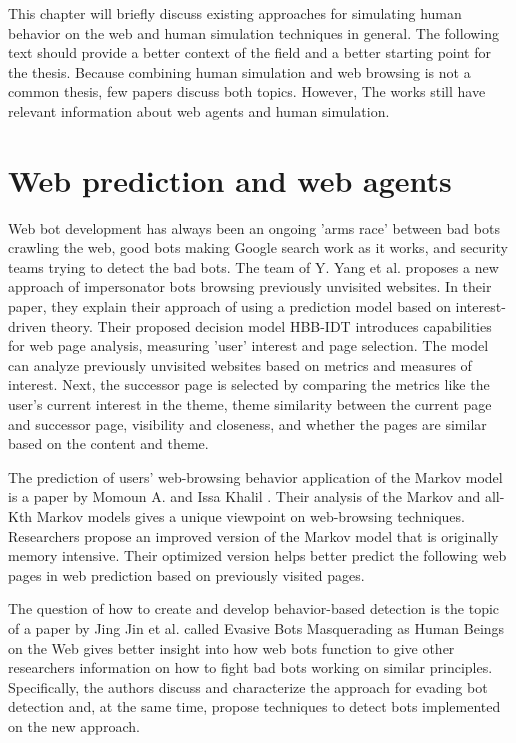 This chapter will briefly discuss existing approaches for simulating human behavior on the web and human simulation techniques in general. The following text should provide a better context of the field and a better starting point for the thesis. Because combining human simulation and web browsing is not a common thesis, few papers discuss both topics. However, The works still have relevant information about web agents and human simulation.

\section{Web prediction and web agents}

Web bot development has always been an ongoing 'arms race' between bad bots crawling the web, good bots making Google search work as it works, and security teams trying to detect the bad bots. The team of Y. Yang et al. \cite{inproceedings} proposes a new approach of impersonator bots browsing previously unvisited websites. In their paper, they explain their approach of using a prediction model based on interest-driven theory. Their proposed decision model HBB-IDT introduces capabilities for web page analysis, measuring 'user' interest and page selection. The model can analyze previously unvisited websites based on metrics and measures of interest. Next, the successor page is selected by comparing the metrics like the user's current interest in the theme, theme similarity between the current page and successor page, visibility and closeness, and whether the pages are similar based on the content and theme. 


The prediction of users' web-browsing behavior application of the Markov model is a paper by Momoun A. and Issa Khalil \cite{markovmodel}. Their analysis of the Markov and all-Kth Markov models gives a unique viewpoint on web-browsing techniques. Researchers propose an improved version of the Markov model that is originally memory intensive. Their optimized version helps better predict the following web pages in web prediction based on previously visited pages. 


The question of how to create and develop behavior-based detection is the topic of a paper by Jing Jin et al. \cite{evasivebots} called Evasive Bots Masquerading as Human Beings on the Web gives better insight into how web bots function to give other researchers information on how to fight bad bots working on similar principles. Specifically, the authors discuss and characterize the approach for evading bot detection and, at the same time, propose techniques to detect bots implemented on the new approach. 


